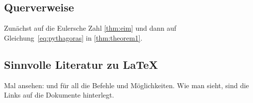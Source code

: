 \subsection{Querverweise}\label{subsec:referenzen}
%
Zunächst auf die Eulersche Zahl \vref{thm:eim} und dann auf Gleichung~\eqref{eq:pythagoras} in \vref{thm:theorem1}.
%
\subsection{Sinnvolle Literatur zu \LaTeX}
%
Mal ansehen: \textcite{l2tabu} und \textcite{lshort-german} \bzw \textcite{latex-refsheet} für all die Befehle und Möglichkeiten.
Wie man sieht, sind die Links auf die Dokumente hinterlegt.

